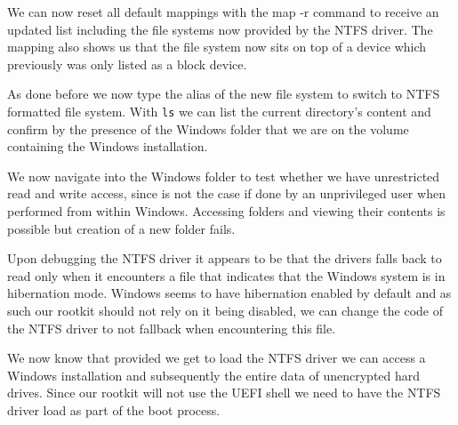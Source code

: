 We can now reset all default mappings with the map -r command to receive an updated list including the file systems now provided by the \ac{NTFS} driver.
The mapping also shows us that the file system now sits on top of a device which previously was only listed as a block device.

As done before we now type the alias of the new file system to switch to NTFS formatted file system.
With \lstinline{ls} we can list the current directory's content and confirm by the presence of the Windows folder that we are on the volume containing the Windows installation.


We now navigate into the Windows folder to test whether we have unrestricted read and write access, since is not the case if done by an unprivileged user when performed from within Windows.
Accessing folders and viewing their contents is possible but creation of a new folder fails.

Upon debugging the \ac{NTFS} driver it appears to be that the drivers falls back to read only when it encounters a file that indicates that the Windows system is in hibernation mode.
Windows seems to have hibernation enabled by default and as such our rootkit should not rely on it being disabled, we can change the code of the \ac{NTFS} driver to not fallback when encountering this file.

We now know that provided we get to load the \ac{NTFS} driver we can access a Windows installation and subsequently the entire data of unencrypted hard drives.
Since our rootkit will not use the UEFI shell we need to have the \ac{NTFS} driver load as part of the boot process.

